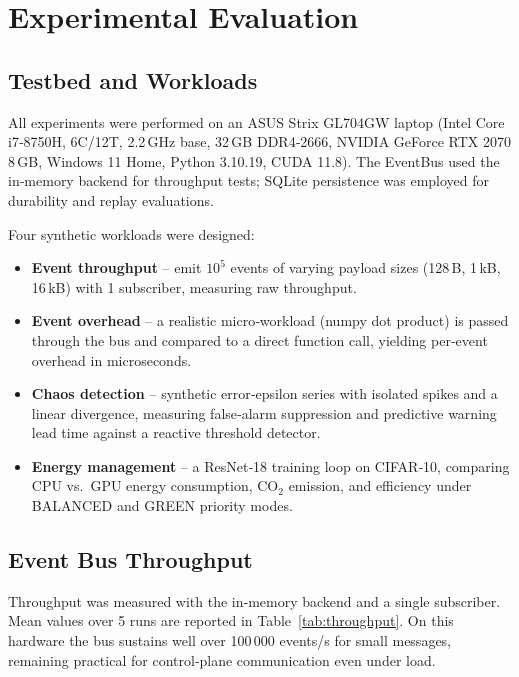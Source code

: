 \section{Experimental Evaluation}

\subsection{Testbed and Workloads}

All experiments were performed on an ASUS Strix GL704GW laptop
(Intel Core i7‑8750H, 6C/12T, 2.2\,GHz base, 32\,GB DDR4‑2666,
NVIDIA GeForce RTX 2070 8\,GB, Windows 11 Home, Python 3.10.19,
CUDA 11.8).  The EventBus used the in‑memory backend for throughput
tests; SQLite persistence was employed for durability and replay
evaluations.

Four synthetic workloads were designed:
\begin{itemize}
    \item \textbf{Event throughput} – emit $10^5$ events of varying payload sizes
          (128\,B, 1\,kB, 16\,kB) with 1 subscriber, measuring raw throughput.
    \item \textbf{Event overhead} – a realistic micro‑workload (numpy dot product)
          is passed through the bus and compared to a direct function call,
          yielding per‑event overhead in microseconds.
    \item \textbf{Chaos detection} – synthetic error‑epsilon series with isolated
          spikes and a linear divergence, measuring false‑alarm suppression and
          predictive warning lead time against a reactive threshold detector.
    \item \textbf{Energy management} – a ResNet‑18 training loop on CIFAR‑10,
          comparing CPU vs.~GPU energy consumption, CO$_2$ emission, and
          efficiency under BALANCED and GREEN priority modes.
\end{itemize}

\subsection{Event Bus Throughput}

Throughput was measured with the in‑memory backend and a single subscriber.
Mean values over 5 runs are reported in Table~\ref{tab:throughput}.  
On this hardware the bus sustains well over 100\,000 events/s for small
messages, remaining practical for control‑plane communication even under load.

